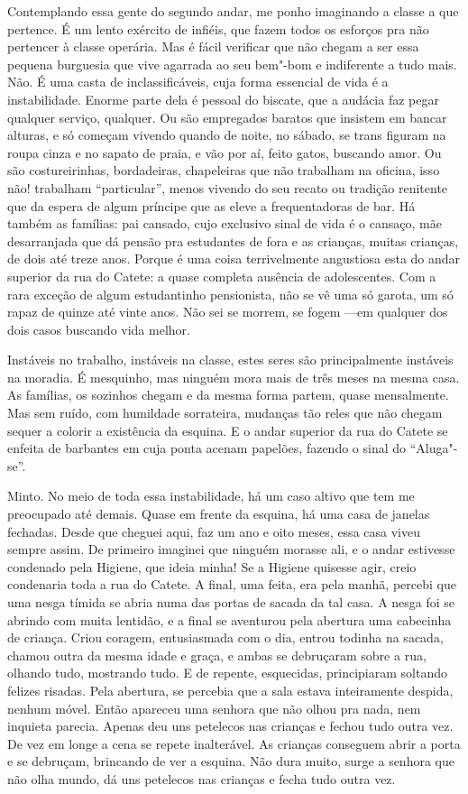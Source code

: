 Contemplando essa gente do segundo andar, me ponho imaginando a classe a
que pertence. É um lento exército de infiéis, que fazem todos os
esforços pra não pertencer à classe operária. Mas é fácil verificar que
não chegam a ser essa pequena burguesia que vive agarrada ao seu bem"-bom
e indiferente a tudo mais. Não. É uma casta de inclassificáveis, cuja
forma essencial de vida é a instabilidade. Enorme parte dela é pessoal
do biscate, que a audácia faz pegar qualquer serviço, qualquer. Ou são
empregados baratos que insistem em bancar alturas, e só começam vivendo
quando de noite, no sábado, se trans figuram na roupa cinza e no sapato
de praia, e vão por aí, feito gatos, buscando amor. Ou são
costureirinhas, bordadeiras, chapeleiras que não trabalham na oficina,
isso não! trabalham ``particular'', menos vivendo do seu recato ou
tradição renitente que da espera de algum príncipe que as eleve a
frequentadoras de bar. Há também as famílias: pai cansado, cujo
exclusivo sinal de vida é o cansaço, mãe desarranjada que dá pensão pra
estudantes de fora e as crianças, muitas crianças, de dois até treze
anos. Porque é uma coisa terrivelmente angustiosa esta do andar superior
da rua do Catete: a quase completa ausência de adolescentes. Com a rara
exceção de algum estudantinho pensionista, não se vê uma só garota, um
só rapaz de quinze até vinte anos. Não sei se morrem, se fogem ---em
qualquer dos dois casos buscando vida melhor.

Instáveis no trabalho, instáveis na classe, estes seres são
principalmente instáveis na moradia. É mesquinho, mas ninguém mora mais
de três meses na mesma casa. As famílias, os sozinhos chegam e da mesma
forma partem, quase mensalmente. Mas sem ruído, com humildade
sorrateira, mudanças tão reles que não chegam sequer a colorir a
existência da esquina. E o andar superior da rua do Catete se enfeita de
barbantes em cuja ponta acenam papelões, fazendo o sinal do ``Aluga"-se''.

Minto. No meio de toda essa instabilidade, há um caso altivo que tem me
preocupado até demais. Quase em frente da esquina, há uma casa de
janelas fechadas. Desde que cheguei aqui, faz um ano e oito meses, essa
casa viveu sempre assim. De primeiro imaginei que ninguém morasse ali, e
o andar estivesse condenado pela Higiene, que ideia minha! Se a Higiene
quisesse agir, creio condenaria toda a rua do Catete. A final, uma
feita, era pela manhã, percebi que uma nesga tímida se abria numa das
portas de sacada da tal casa. A nesga foi se abrindo com muita lentidão,
e a final se aventurou pela abertura uma cabecinha de criança. Criou
coragem, entusiasmada com o dia, entrou todinha na sacada, chamou outra
da mesma idade e graça, e ambas se debruçaram sobre a rua, olhando tudo,
mostrando tudo. E de repente, esquecidas, principiaram soltando felizes
risadas. Pela abertura, se percebia que a sala estava inteiramente
despida, nenhum móvel. Então apareceu uma senhora que não olhou pra
nada, nem inquieta parecia. Apenas deu uns petelecos nas crianças e
fechou tudo outra vez. De vez em longe a cena se repete inalterável. As
crianças conseguem abrir a porta e se debruçam, brincando de ver a
esquina. Não dura muito, surge a senhora que não olha mundo, dá uns
petelecos nas crianças e fecha tudo outra vez.

